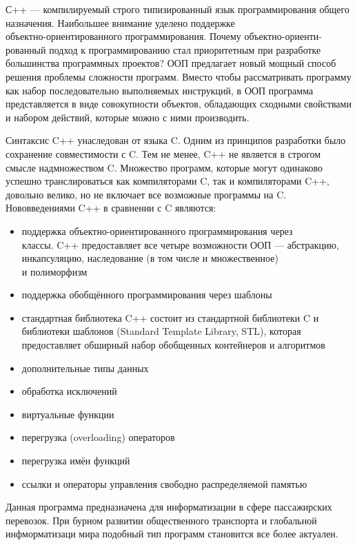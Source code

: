 
С++ — компилируемый строго типизированный язык программирования общего назначения.
Наибольшее внимание уделено поддержке\\объектно-ориентированного программирования. Почему объектно-ориенти-рованный подход к программированию стал приоритетным при разработке большинства программных проектов? ООП предлагает новый мощный способ решения проблемы сложности программ. Вместо чтобы рассматривать программу как набор последовательно выполняемых инструкций, в ООП программа представляется в виде совокупности объектов, обладающих сходными свойствами и набором действий, которые можно с ними производить. 

Синтаксис C++ унаследован от языка C\cite{straus}. Одним из принципов разработки было сохранение совместимости с C. Тем не менее, C++ не является в строгом смысле надмножеством C. Множество программ, которые могут одинаково успешно транслироваться как компиляторами C, так и компиляторами C++, довольно велико, но не включает все возможные программы на C. Нововведениями C++ в сравнении с C являются:
\begin{itemize}
    \item поддержка объектно-ориентированного программирования через \\классы. C++ предоставляет все четыре возможности ООП — абстракцию, инкапсуляцию, наследование (в том числе и множественное) \\и полиморфизм\cite{kova}
    \item поддержка обобщённого программирования через шаблоны
    \item стандартная библиотека C++ состоит из стандартной библиотеки C и библиотеки шаблонов (Standard Template Library, STL), которая предоставляет обширный набор обобщенных контейнеров и алгоритмов
    \item дополнительные типы данных
    \item обработка исключений
    \item виртуальные функции
    \item перегрузка (overloading) операторов
    \item перегрузка имён функций
    \item ссылки и операторы управления свободно распределяемой памятью
\end{itemize}
Данная программа предназначена для информатизации в сфере пассажирских перевозок. При бурном развитии общественного транспорта и глобальной инфморматизаци мира подобный тип программ становится все более актуален.